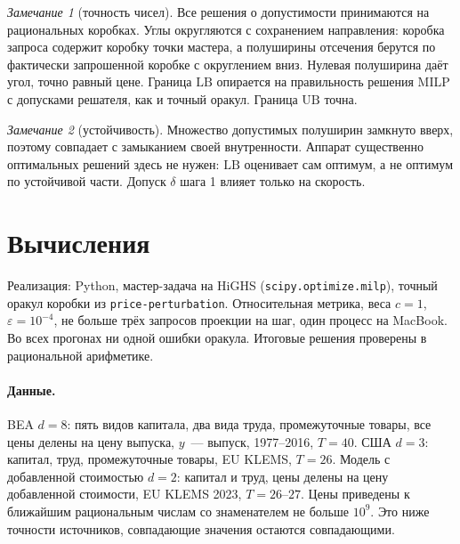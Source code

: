 \documentclass[a4paper,11pt]{article}
\theoremstyle{plain}
\theoremstyle{definition}
\theoremstyle{remark}
\newtheorem*{remark}{Замечание}
\newcommand{\LB}{\mathrm{LB}}
\newcommand{\UB}{\mathrm{UB}}
\begin{document}
\begin{remark}[точность чисел]
    Все решения о допустимости принимаются на рациональных коробках. Углы округляются с сохранением направления: коробка запроса содержит коробку точки мастера, а полуширины отсечения берутся по фактически запрошенной коробке с округлением вниз. Нулевая полуширина даёт угол, точно равный цене. Граница $\LB$ опирается на правильность решения MILP с допусками решателя, как и точный оракул. Граница $\UB$ точна.
\end{remark}

\begin{remark}[устойчивость]
    Множество допустимых полуширин замкнуто вверх, поэтому совпадает с замыканием своей внутренности. Аппарат существенно оптимальных решений \cite{Tuy2005} здесь не нужен: $\LB$ оценивает сам оптимум, а не оптимум по устойчивой части. Допуск $\delta$ шага 1 влияет только на скорость.
\end{remark}

\section{Вычисления}\label{sec:comp}

Реализация: Python, мастер-задача на HiGHS (\texttt{scipy.optimize.milp}), точный оракул коробки из \texttt{price-perturbation}. Относительная метрика, веса $c=1$, $\varepsilon=10^{-4}$, не больше трёх запросов проекции на шаг, один процесс на MacBook. Во всех прогонах ни одной ошибки оракула. Итоговые решения проверены в рациональной арифметике.

\paragraph{Данные.} BEA $d=8$: пять видов капитала, два вида труда, промежуточные товары, все цены делены на цену выпуска, $y$~--- выпуск, 1977--2016, $T=40$. США $d=3$: капитал, труд, промежуточные товары, EU KLEMS, $T=26$. Модель с добавленной стоимостью $d=2$: капитал и труд, цены делены на цену добавленной стоимости, EU KLEMS 2023, $T=26$--$27$. Цены приведены к ближайшим рациональным числам со знаменателем не больше $10^9$. Это ниже точности источников, совпадающие значения остаются совпадающими.
\end{document}
